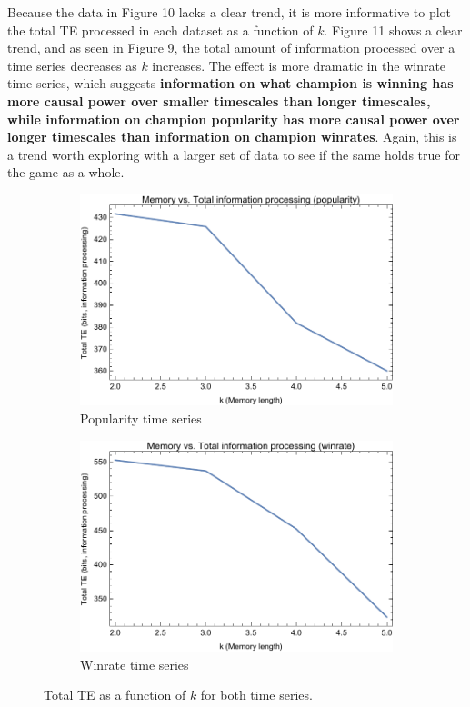 \documentclass[twoside]{article}
\begin{document}
\begin{multicols}{2}
Because the data in Figure 10 lacks a clear trend, it is more informative to plot the total TE processed in each dataset as a function of $k$. Figure 11 shows a clear trend, and as seen in Figure 9, the total amount of information processed over a time series decreases as $k$ increases. The effect is more dramatic in the winrate time series, which suggests \textbf{information on what champion is winning has more causal power over smaller timescales than longer timescales, while information on champion popularity has more causal power over longer timescales than information on champion winrates}. Again, this is a trend worth exploring with a larger set of data to see if the same holds true for the game as a whole.

\begin{figure}
\centering
\begin{subfigure}{.5\textwidth}
  \centering
  \includegraphics[width=0.9\linewidth]{popularity_memvsTE_prelim.pdf}
  \caption{Popularity time series}
  \label{fig:sub1}
\end{subfigure}%
\begin{subfigure}{.5\textwidth}
  \centering
  \includegraphics[width=0.9\linewidth]{winrate_memvsTE_prelim.pdf}
  \caption{Winrate time series}
  \label{fig:sub2}
\end{subfigure}
\caption{Total TE as a function of $k$ for both time series.}
\label{fig:test}
\end{figure}


\end{multicols}
\end{document}
